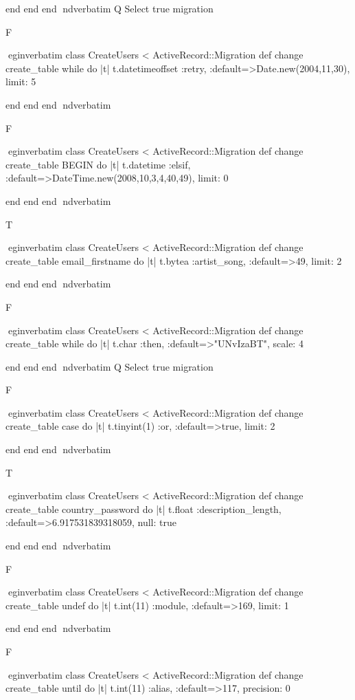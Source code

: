     end 
  end 
end
nd{verbatim}
Q
 Select true migration

F

egin{verbatim}
 class CreateUsers < ActiveRecord::Migration 
  def change 
    create_table while do |t| 
      t.datetimeoffset :retry, :default=>Date.new(2004,11,30), limit: 5
    
    end 
  end 
end
nd{verbatim}

F

egin{verbatim}
 class CreateUsers < ActiveRecord::Migration 
  def change 
    create_table BEGIN do |t| 
      t.datetime :elsif, :default=>DateTime.new(2008,10,3,4,40,49), limit: 0
    
    end 
  end 
end
nd{verbatim}

T

egin{verbatim}
 class CreateUsers < ActiveRecord::Migration 
  def change 
    create_table email_firstname do |t| 
      t.bytea :artist_song, :default=>49, limit: 2
    
    end 
  end 
end
nd{verbatim}

F

egin{verbatim}
 class CreateUsers < ActiveRecord::Migration 
  def change 
    create_table while do |t| 
      t.char :then, :default=>"UNvIzaBT", scale: 4
    
    end 
  end 
end
nd{verbatim}
Q
 Select true migration

F

egin{verbatim}
 class CreateUsers < ActiveRecord::Migration 
  def change 
    create_table case do |t| 
      t.tinyint(1) :or, :default=>true, limit: 2
    
    end 
  end 
end
nd{verbatim}

T

egin{verbatim}
 class CreateUsers < ActiveRecord::Migration 
  def change 
    create_table country_password do |t| 
      t.float :description_length, :default=>6.917531839318059, null: true
    
    end 
  end 
end
nd{verbatim}

F

egin{verbatim}
 class CreateUsers < ActiveRecord::Migration 
  def change 
    create_table undef do |t| 
      t.int(11) :module, :default=>169, limit: 1
    
    end 
  end 
end
nd{verbatim}

F

egin{verbatim}
 class CreateUsers < ActiveRecord::Migration 
  def change 
    create_table until do |t| 
      t.int(11) :alias, :default=>117, precision: 0
    
